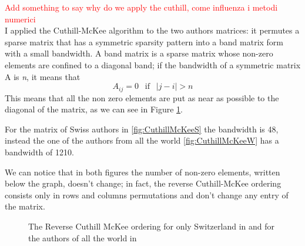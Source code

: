 \documentclass[]{usiinfbachelorproject}
\begin{document}
\textcolor{red}{Add something to say why do we apply the cuthill, come influenza i metodi numerici}\\
I applied the Cuthill-McKee algorithm to the two authors matrices: it permutes a sparse matrix that has a symmetric sparsity pattern into a band matrix form with a small bandwidth.
A band matrix is a sparse matrix whose non-zero elements are confined to a diagonal band; if the bandwidth of a symmetric matrix A is \textit{n}, it means that 
$$A_{ij} = 0  \:\: \text{ if } \:\: |j-i| > n$$
 This means that all the non zero elements are put as near as possible to the diagonal of the matrix, as we can see in Figure \ref{fig:CuthillMcKee}. 
 
For the matrix of Swiss authors in \ref{fig:CuthillMcKeeS} the bandwidth is 48, instead the one of the authors from all the world \ref{fig:CuthillMcKeeW} has a bandwidth of 1210. 

We can notice that in both figures the number of non-zero elements, written below the graph, doesn't change; in fact, the reverse Cuthill-McKee ordering consists only in rows and columns permutations and don't change any entry of the matrix.

\begin{figure}[tb]
	\centering
	\caption{ The Reverse Cuthill McKee ordering for only Switzerland in  and for the authors of all the world in }
	\label{fig:CuthillMcKee}
\end{figure}
\end{document}
